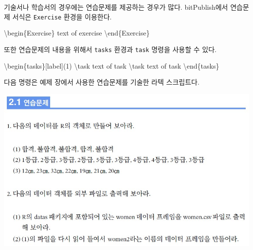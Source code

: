 \documentclass[
  letterpaper,
]{book}
\newenvironment{Shaded}{\begin{snugshade}}{\end{snugshade}}
\newcommand{\ExtensionTok}[1]{\textcolor[rgb]{0.00,0.23,0.31}{#1}}
\newcommand{\FunctionTok}[1]{\textcolor[rgb]{0.28,0.35,0.67}{#1}}
\newcommand{\KeywordTok}[1]{\textcolor[rgb]{0.00,0.23,0.31}{#1}}
\newcommand{\NormalTok}[1]{\textcolor[rgb]{0.00,0.23,0.31}{#1}}
\begin{document}
기술서나 학습서의 경우에는 연습문제를 제공하는 경우가 많다.
bitPublish에서 연습문제 서식은 \texttt{Exercise} 환경을 이용한다.

\begin{Shaded}
\begin{Highlighting}[]
\KeywordTok{\textbackslash{}begin}\NormalTok{\{}\ExtensionTok{Exercise}\NormalTok{\}}
\NormalTok{  text of exercise}
\KeywordTok{\textbackslash{}end}\NormalTok{\{}\ExtensionTok{Exercise}\NormalTok{\}}
\end{Highlighting}
\end{Shaded}

또한 연습문제의 내용을 위해서 \texttt{tasks} 환경과
\texttt{task} 명령을 사용할 수 있다.

\begin{Shaded}
\begin{Highlighting}[]
\KeywordTok{\textbackslash{}begin}\NormalTok{\{}\ExtensionTok{tasks}\NormalTok{\}[label](1)}
 \FunctionTok{\textbackslash{}task}\NormalTok{ text of task}
 \FunctionTok{\textbackslash{}task}\NormalTok{ text of task}
\KeywordTok{\textbackslash{}end}\NormalTok{\{}\ExtensionTok{tasks}\NormalTok{\}}
\end{Highlighting}
\end{Shaded}

다음 명령은 예제 장에서 사용한 연습문제를 기술한 라텍 스크립트다.

\includegraphics{images/exercise.jpg}
\end{document}
